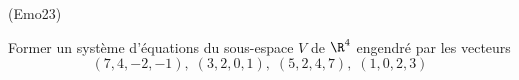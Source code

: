 \begin{tiny}(Emo23)\end{tiny} Former un système d'équations du sous-espace $V$ de $\R^4$ engendré par les vecteurs
\begin{displaymath}
 (7,4,-2,-1),\;(3,2,0,1),\; (5,2,4,7),\;(1,0,2,3)
\end{displaymath}

 